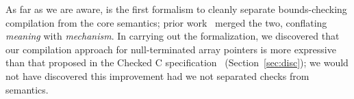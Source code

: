 As far as we are aware, \lang is the first formalism to cleanly
separate bounds-checking compilation from the core semantics; prior
work~\cite{Feng2006,Condit2007} merged the two, conflating
\emph{meaning} with \emph{mechanism}. In carrying out the
formalization, we discovered that our compilation approach for
null-terminated array pointers is more expressive than that proposed
in the Checked C specification~\cite{checkedc}
(Section~\ref{sec:disc}); we would not have discovered this
improvement had we not separated checks from semantics.

%  


